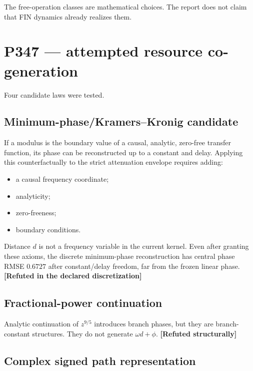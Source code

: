 \documentclass[11pt,a4paper,openany]{report}
\begin{document}
The free-operation classes are mathematical choices. The report does not claim that FIN dynamics already realizes them.

\chapter{P347 --- attempted resource co-generation}

Four candidate laws were tested.

\section{Minimum-phase/\allowbreak{}Kramers--Kronig candidate}

If a modulus is the boundary value of a causal, analytic, zero-free transfer function, its phase can be reconstructed up to a constant and delay. Applying this counterfactually to the strict attenuation envelope requires adding:

\begin{itemize}
\item 
a causal frequency coordinate;

\item 
analyticity;

\item 
zero-freeness;

\item 
boundary conditions.

\end{itemize}

Distance \(d\) is not a frequency variable in the current kernel. Even after granting these axioms, the discrete minimum-phase reconstruction has central phase RMSE \(0.6727\) after constant/\allowbreak{}delay freedom, far from the frozen linear phase. \textbf{[Refuted in the declared discretization]}

\section{Fractional-power continuation}

Analytic continuation of \(z^{9/5}\) introduces branch phases, but they are branch-constant structures. They do not generate \(\omega d+\phi\). \textbf{[Refuted structurally]}

\section{Complex signed path representation}
\end{document}
